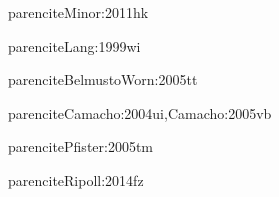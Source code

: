 \documentclass{report}
\begin{document}
		\begin{ThreePartTable}
			\tabulinesep=1.2mm

		
		\begin{tablenotes}
			\item[a] parencite{Minor:2011hk}
			\item[b] parencite{Lang:1999wi}
			\item[c] parencite{BelmustoWorn:2005tt}
			\item[d] parencite{Camacho:2004ui,Camacho:2005vb}
			\item[e] parencite{Pfister:2005tm}
			\item[f] parencite{Ripoll:2014fz}
		\end{tablenotes}
		\end{ThreePartTable}
\end{document}
